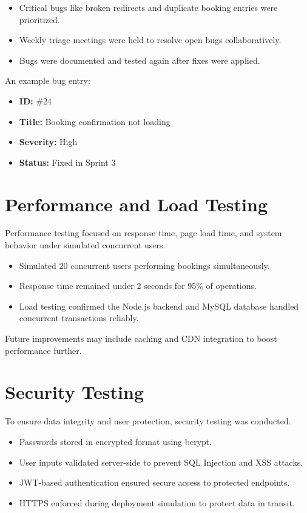 \begin{itemize}
    \item Critical bugs like broken redirects and duplicate booking entries were prioritized.
    \item Weekly triage meetings were held to resolve open bugs collaboratively.
    \item Bugs were documented and tested again after fixes were applied.
\end{itemize}

An example bug entry:
\begin{itemize}
    \item \textbf{ID:} \#24
    \item \textbf{Title:} Booking confirmation not loading
    \item \textbf{Severity:} High
    \item \textbf{Status:} Fixed in Sprint 3
\end{itemize}

\section{Performance and Load Testing}
Performance testing focused on response time, page load time, and system behavior under simulated concurrent users.

\begin{itemize}
    \item Simulated 20 concurrent users performing bookings simultaneously.
    \item Response time remained under 2 seconds for 95\% of operations.
    \item Load testing confirmed the Node.js backend and MySQL database handled concurrent transactions reliably.
\end{itemize}

Future improvements may include caching and CDN integration to boost performance further.

\section{Security Testing}
To ensure data integrity and user protection, security testing was conducted.

\begin{itemize}
    \item Passwords stored in encrypted format using bcrypt.
    \item User inputs validated server-side to prevent SQL Injection and XSS attacks.
    \item JWT-based authentication ensured secure access to protected endpoints.
    \item HTTPS enforced during deployment simulation to protect data in transit.
\end{itemize}

